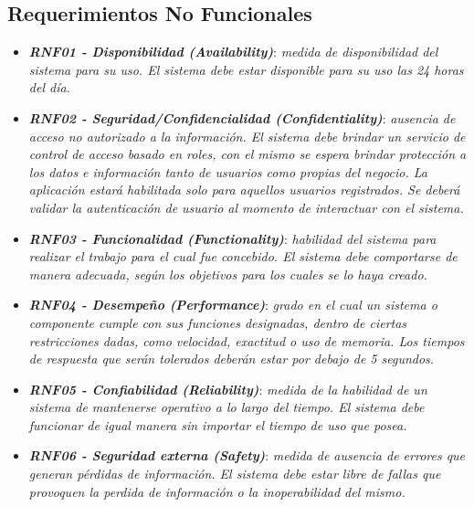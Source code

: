 \documentclass[11pt,oneside]{book}
\begin{document}
\subsection{Requerimientos No Funcionales}
\begin{itemize}
\item \textit{\textbf{RNF01 - Disponibilidad (Availability)}}: \textit{medida de disponibilidad del sistema para su uso. El sistema debe estar disponible para su uso las 24 horas del día.} %

\item \textit{\textbf{RNF02 - Seguridad/Confidencialidad (Confidentiality)}}: \textit{ausencia de acceso no autorizado a la información. El sistema debe brindar un servicio de control de acceso basado en roles, con el mismo se espera brindar protección a los datos e información tanto de usuarios como propias del negocio. La aplicación estará habilitada solo para aquellos usuarios registrados. Se deberá validar la autenticación de usuario al momento de interactuar con el sistema.} %

\item \textit{\textbf{RNF03 - Funcionalidad (Functionality)}}: \textit{habilidad del sistema para realizar el trabajo para el cual fue concebido. El sistema debe comportarse de manera adecuada, según los objetivos para los cuales se lo haya creado.} %

\item \textit{\textbf{RNF04 - Desempeño (Performance)}}: \textit{grado en el cual un sistema o componente cumple con sus funciones designadas, dentro de ciertas restricciones dadas, como velocidad, exactitud o uso de memoria. Los tiempos de respuesta que serán tolerados deberán estar por debajo de 5 segundos.} %

\item \textit{\textbf{RNF05 - Confiabilidad (Reliability)}}: \textit{medida de la habilidad de un sistema de mantenerse operativo a lo largo del tiempo. El sistema debe funcionar de igual manera sin importar el tiempo de uso que posea.} %

\item \textit{\textbf{RNF06 - Seguridad externa (Safety)}}: \textit{medida de ausencia de errores que generan pérdidas de información. El sistema debe estar libre de fallas que provoquen la perdida de información o la inoperabilidad del mismo.}%


\end{itemize}
\end{document}
